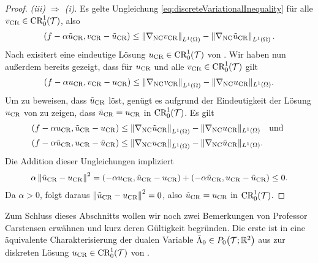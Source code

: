 \begin{proof}
  \textit{(iii) $\Rightarrow$ (i)}.
  Es gelte Ungleichung \eqref{eq:discreteVariationalInequality} für alle
  $v_\textup{CR}\in\textup{CR}^1_0(\mathcal{T})$, also
  \begin{align*}
    \left(f-\alpha\tilde{u}_{\textup{CR}},v_\textup{CR}-\tilde{u}_{\textup{CR}}\right) 
    \leq
    \left\Vert\nabla_\textup{NC}v_\textup{CR}\right\Vert_{L^1(\Omega)}
    -\left\Vert\nabla_\textup{NC}\tilde{u}_{\textup{CR}}\right\Vert_{L^1(\Omega)}.
  \end{align*}
  Nach  exisitert eine eindeutige
  Lösung $u_\textup{CR}\in\textup{CR}^1_0(\mathcal{T})$ von .
  Wir haben nun außerdem bereits gezeigt, dass für $u_\textup{CR}$ und alle
  $v_\textup{CR}\in\textup{CR}^1_0(\mathcal{T})$ gilt
  \begin{align*}
    \left(f-\alpha u_\textup{CR},v_\textup{CR}-u_\textup{CR}\right) 
    \leq
    \left\Vert\nabla_\textup{NC}v_\textup{CR}\right\Vert_{L^1(\Omega)}
    -\Vert\nabla_\textup{NC}u_\textup{CR}\Vert_{L^1(\Omega)}.
  \end{align*}
  Um zu beweisen, dass $\tilde{u}_{\textup{CR}}$  löst, genügt es
  aufgrund der Eindeutigkeit der Lösung $u_\textup{CR}$ von
   zu zeigen, dass $\tilde{u}_{\textup{CR}}=u_\textup{CR}$ in
  $\textup{CR}^1_0(\mathcal{T})$.
  Es gilt
  \begin{align*}
    \left(f-\alpha u_\textup{CR},\tilde{u}_{\textup{CR}}-u_\textup{CR}\right) 
    &\leq
    \left\Vert\nabla_\textup{NC}\tilde{u}_{\textup{CR}}\right\Vert_{L^1(\Omega)}
    -\Vert\nabla_\textup{NC}u_\textup{CR}\Vert_{L^1(\Omega)}\quad\text{und }\\
    \left(f-\alpha\tilde{u}_{\textup{CR}},u_\textup{CR}-\tilde{u}_{\textup{CR}}\right) 
    &\leq
    \left\Vert\nabla_\textup{NC}u_\textup{CR}\right\Vert_{L^1(\Omega)}
    -\Vert\nabla_\textup{NC}\tilde{u}_{\textup{CR}}\Vert_{L^1(\Omega)}. 
  \end{align*}
  Die Addition dieser Ungleichungen
  impliziert
  \begin{align*}
    \alpha\left\Vert\tilde{u}_{\textup{CR}}-u_\textup{CR}\right\Vert^2=
    \left(-\alpha u_\textup{CR},\tilde{u}_{\textup{CR}}-u_\textup{CR}\right) 
    + \left(-\alpha\tilde{u}_{\textup{CR}},u_\textup{CR}-\tilde{u}_{\textup{CR}}\right) 
    \leq
    0.
  \end{align*}
  Da $\alpha>0$, folgt daraus $\left\Vert\tilde{u}_{\textup{CR}}-u_\textup{CR}\right\Vert^2=0$,
  also $\tilde{u}_{\textup{CR}}=u_\textup{CR}$ in $\textup{CR}^1_0(\mathcal{T})$.
\end{proof}

Zum Schluss dieses Abschnitts wollen wir noch zwei Bemerkungen von Professor
Carstensen erwähnen und kurz deren Gültigkeit begründen.
Die erste ist in eine äquivalente Charakterisierung der dualen Variable
$\bar\Lambda_0\in P_0\!\left(\mathcal{T};\mathbb{R}^2\right)$ aus
 zur diskreten Lösung
$u_\textup{CR}\in\textup{CR}^1_0(\mathcal{T})$ von .

